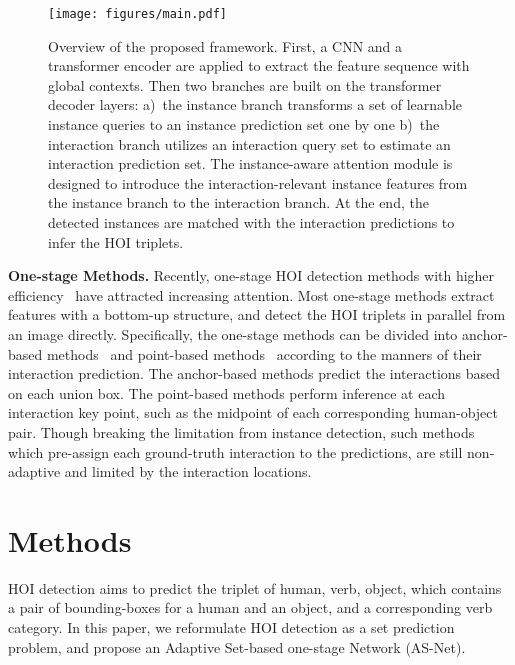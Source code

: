 \documentclass[final]{cvpr}
\begin{document}
\begin{figure*}[htb]
  \centering
  \texttt{[image: figures/main.pdf]}
  \vspace{-0.5mm}
  \caption{Overview of the proposed framework. First, a CNN and a transformer encoder are applied to extract the feature sequence with global contexts. Then two branches are built on the transformer decoder layers: a)~the instance branch transforms a set of learnable instance queries to an instance prediction set one by one b)~the interaction branch utilizes an interaction query set to estimate an interaction prediction set. The instance-aware attention module is designed to introduce the interaction-relevant instance features from the instance branch to the interaction branch. At the end, the detected instances are matched with the interaction predictions to infer the HOI triplets.}
  \label{framework}\vspace{-2mm}
\end{figure*}

\noindent\textbf{One-stage Methods.} 
Recently, one-stage HOI detection methods with higher efficiency~\cite{Kim2020_unidet, liao2020ppdm} have attracted increasing attention. Most one-stage methods extract features with a bottom-up structure\cite{newell2016stacked, Yu_2018_CVPR}, and detect the HOI triplets in parallel from an image directly. Specifically, the one-stage methods can be divided into anchor-based methods~\cite{Kim2020_unidet} and point-based methods~\cite{liao2020ppdm} according to the manners of their interaction prediction. The anchor-based methods predict the interactions based on each union box. The point-based methods perform inference at each interaction key point, such as the midpoint of each corresponding human-object pair. Though breaking the limitation from instance detection, such methods which pre-assign each ground-truth interaction to the predictions, are still non-adaptive and limited by the interaction locations.
\vspace{-2.5mm}\section{Methods}
\vspace{-1.5mm}
HOI detection aims to predict the triplet of human, verb, object, which contains a pair of bounding-boxes for a human and an object, and a corresponding verb category. In this paper, we reformulate HOI detection as a set prediction problem, and propose an Adaptive Set-based one-stage Network (AS-Net). 
\end{document}
